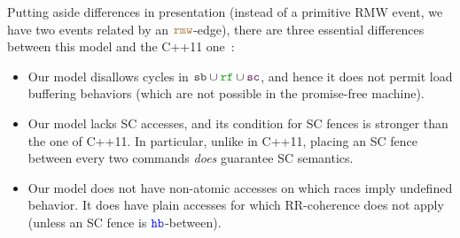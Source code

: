 %


Putting aside  differences in presentation (\eg instead of a primitive RMW event,
we have two events related by an $\lRMW$-edge), 
there are three essential differences between this model and the C++11 one~\cite{Batty:2011}:
\begin{itemize}
\item Our model disallows cycles in $\lSB\cup\lRF\cup\lSC$, and hence it does not
permit load buffering behaviors (which are not possible in the promise-free machine).
\item Our model lacks SC accesses, and its condition for SC fences is stronger than the one
of C++11. In particular, unlike in C++11, placing an SC fence between every two commands
\emph{does} guarantee SC semantics.
\item Our model does not have non-atomic accesses on which races imply undefined behavior.
It does have plain accesses for which RR-coherence does not apply 
(unless an SC fence is ${\color{blue} \texttt{hb}}$-between).
\end{itemize}

